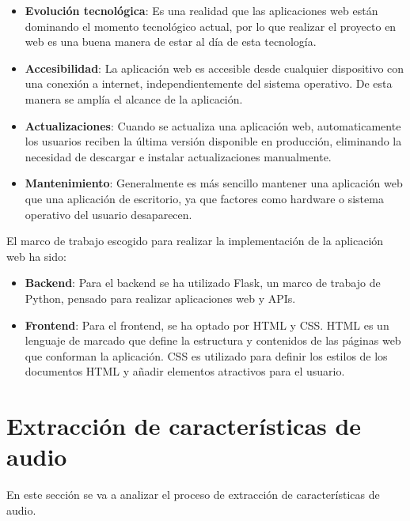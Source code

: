 \begin{itemize}

\item \textbf{Evolución tecnológica}: Es una realidad que las aplicaciones web están dominando el momento tecnológico actual, por lo que realizar el proyecto en web es una buena manera de estar al día de esta tecnología.

\item \textbf{Accesibilidad}: La aplicación web es accesible desde cualquier dispositivo con una conexión a internet, independientemente del sistema operativo. De esta manera se amplía el alcance de la aplicación.

\item \textbf{Actualizaciones}: Cuando se actualiza una aplicación web, automaticamente los usuarios reciben la última versión disponible en producción, eliminando la necesidad de descargar e instalar actualizaciones manualmente. 

\item \textbf{Mantenimiento}: Generalmente es más sencillo mantener una aplicación web que una aplicación de escritorio, ya que factores como hardware o sistema operativo del usuario desaparecen.
\end{itemize}

El marco de trabajo escogido para realizar la implementación de la aplicación web ha sido:

\begin{itemize}

\item \textbf{Backend}: Para el backend se ha utilizado Flask, un marco de trabajo de Python, pensado para realizar aplicaciones web y APIs.

\item \textbf{Frontend}: Para el frontend, se ha optado por HTML y CSS. HTML es un lenguaje de marcado que define la estructura y contenidos de las páginas web que conforman la aplicación. CSS es utilizado para definir los estilos de los documentos HTML y añadir elementos atractivos para el usuario.

\end{itemize}

\newpage

\section{Extracción de características de audio}

En este sección se va a analizar el proceso de extracción de características de audio.


